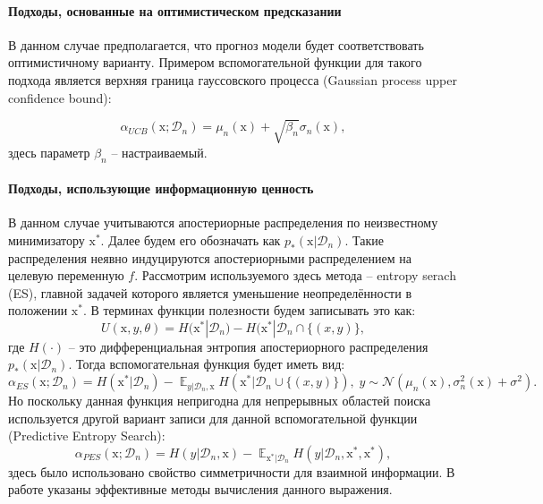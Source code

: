 \documentclass[12pt,fleqn]{article}
\DeclareMathOperator*{\E}{\mathbb{E}}
\begin{document}
\paragraph{Подходы, основанные на оптимистическом предсказании} 
В данном случае предполагается, что прогноз модели будет соответствовать оптимистичному варианту. Примером вспомогательной функции для такого подхода является верхняя граница гауссовского процесса (Gaussian process upper confidence bound): 

$$
     \alpha_{UCB}(\boldsymbol{\mathrm{x}}; \mathcal{D}_n) = 
     \mu_n(\boldsymbol{\mathrm{x}}) + \sqrt{\beta_n}\sigma_n(\boldsymbol{\mathrm{x}}), 
$$
здесь параметр $\beta_n$ -- настраиваемый. 

\paragraph{Подходы, использующие информационную ценность}

В данном случае учитываются апостериорные распределения по неизвестному минимизатору $\boldsymbol{\mathrm{x^{*}}}$. Далее будем его обозначать как $p_{*}(\boldsymbol{\mathrm{x}} | \mathcal{D}_{n})$. Такие распределения неявно индуцируются апостериорными распределением на целевую переменную $f$.
Рассмотрим используемого здесь метода -- entropy serach (ES), главной задачей которого является уменьшение неопределённости в положении $\boldsymbol{\mathrm{x^{*}}}$. В терминах функции полезности будем записывать это как:
$$U(\boldsymbol{\mathrm{x}}, y, \theta) = H(\boldsymbol{\mathrm{x^{*}}} | \mathcal{D}_n) - H(\boldsymbol{\mathrm{x^{*}}} | \mathcal{D}_n \cap \{(x, y)\},$$
где $H(\cdot)$ -- это дифференциальная энтропия апостериорного распределения $p_{*}(\boldsymbol{\mathrm{x}} | \mathcal{D}_{n})$. Тогда вспомогательная функция будет иметь вид:
$$
    \alpha_{ES}(\boldsymbol{\mathrm{x}} ; \mathcal{D}_{n}) = H(\boldsymbol{\mathrm{x^{*}}} | \mathcal{D}_n) - \E_{y | \mathcal{D}_n, \boldsymbol{\mathrm{x}}} H(\boldsymbol{\mathrm{x^{*}}} | \mathcal{D}_n \cup \{(x, y)\}),\; y \sim \mathcal{N}(\mu_n(\boldsymbol{\mathrm{x}}), \sigma_n^2(\boldsymbol{\mathrm{x}}) + \sigma^2).
$$
Но поскольку данная функция непригодна для непрерывных областей поиска используется другой вариант записи для данной вспомогательной функции (Predictive Entropy Search):
$$
\alpha_{PES}(\boldsymbol{\mathrm{x}} ; \mathcal{D}_{n}) = H(y | \mathcal{D}_n, \boldsymbol{\mathrm{x}}) - \E_{ \boldsymbol{\mathrm{x^{*}}} | \mathcal{D}_n} H(y | \mathcal{D}_n, \boldsymbol{\mathrm{x^{*}}}, \boldsymbol{\mathrm{x^{*}}}),
$$
здесь было использовано свойство симметричности для взаимной информации. В работе \cite{hernndezlobato2014predictive} указаны эффективные методы вычисления данного выражения.
\end{document}
